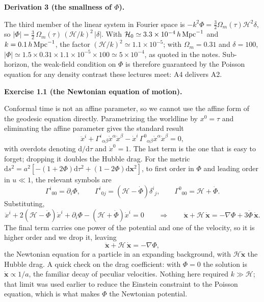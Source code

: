 \documentclass[a4paper,11pt]{article}
\newcommand{\vx}{\bm{x}}
\def\cH{\mathcal{H}}
\newcommand{\dd}{\mathrm{d}}
\def\Om{\Omega_m}
\newenvironment{solution}[1]
  {\par\medskip\noindent\textbf{#1}\par\nobreak\smallskip}
  {\par\medskip}
\begin{document}
\begin{solution}{Derivation 3 (the smallness of $\Phi$).}
The third member of the linear system in Fourier space is
$-k^2\Phi = \tfrac32\Om(\tau)\cH^2\delta$, so
$|\Phi| = \tfrac32\,\Om(\tau)\,(\cH/k)^2\,|\delta|$. With
$\cH_0 \simeq 3.3\times10^{-4}\,h\,{\rm Mpc}^{-1}$ and
$k = 0.1\,h\,{\rm Mpc}^{-1}$, the factor $(\cH/k)^2 \simeq 1.1\times10^{-5}$;
with $\Om = 0.31$ and $\delta = 100$,
$|\Phi| \simeq 1.5 \times 0.31 \times 1.1\times10^{-5} \times 100
\simeq 5\times10^{-4}$, as quoted in the notes. Sub-horizon, the weak-field
condition on $\Phi$ is therefore guaranteed by the Poisson equation for any
density contrast these lectures meet: A4 delivers A2.
\end{solution}

\begin{solution}{Exercise 1.1 (the Newtonian equation of motion).}
Conformal time is not an affine parameter, so we cannot use the affine form of
the geodesic equation directly. Parametrizing the worldline by $x^0 = \tau$ and
eliminating the affine parameter gives the standard result
\begin{equation*}
\ddot x^i + \Gamma^i{}_{\alpha\beta}\dot x^\alpha\dot x^\beta
- \dot x^i\,\Gamma^0{}_{\alpha\beta}\dot x^\alpha\dot x^\beta = 0 ,
\end{equation*}
with overdots denoting $\dd/\dd\tau$ and $\dot x^0 = 1$. The last term is the
one that is easy to forget; dropping it doubles the Hubble drag. For the metric
$\dd s^2 = a^2[-(1+2\Phi)\dd\tau^2 + (1-2\Phi)\dd\vx^2]$, to first order in
$\Phi$ and leading order in $u \ll 1$, the relevant symbols are
\begin{equation*}
\Gamma^i{}_{00} = \partial_i\Phi ,
\qquad
\Gamma^i{}_{0j} = \left(\cH - \dot\Phi\right)\delta^i{}_j ,
\qquad
\Gamma^0{}_{00} = \cH + \dot\Phi .
\end{equation*}
Substituting,
\begin{equation*}
\ddot x^i + 2\left(\cH-\dot\Phi\right)\dot x^i + \partial_i\Phi
- \left(\cH+\dot\Phi\right)\dot x^i = 0
\qquad\Longrightarrow\qquad
\ddot{\vx} + \cH\,\dot{\vx} = -\nabla\Phi + 3\dot\Phi\,\dot{\vx} .
\end{equation*}
The final term carries one power of the potential and one of the velocity, so it
is higher order and we drop it, leaving
\begin{equation*}
\ddot{\vx} + \cH\,\dot{\vx} = -\nabla\Phi ,
\end{equation*}
the Newtonian equation for a particle in an expanding background, with $\cH\dot{\vx}$
the Hubble drag. A quick check on the drag coefficient: with $\Phi = 0$ the
solution is $\dot{\vx} \propto 1/a$, the familiar decay of peculiar velocities.
Nothing here required $k \gg \cH$; that limit was used earlier to reduce the
Einstein constraint to the Poisson equation, which is what makes $\Phi$ the
Newtonian potential.
\end{solution}
\end{document}
